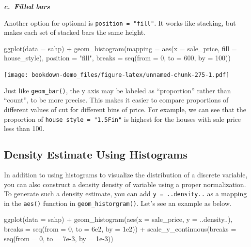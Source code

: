 \documentclass[
]{book}
\newenvironment{Shaded}{\begin{snugshade}}{\end{snugshade}}
\newcommand{\AttributeTok}[1]{\textcolor[rgb]{0.77,0.63,0.00}{#1}}
\newcommand{\DecValTok}[1]{\textcolor[rgb]{0.00,0.00,0.81}{#1}}
\newcommand{\FloatTok}[1]{\textcolor[rgb]{0.00,0.00,0.81}{#1}}
\newcommand{\FunctionTok}[1]{\textcolor[rgb]{0.00,0.00,0.00}{#1}}
\newcommand{\NormalTok}[1]{#1}
\newcommand{\SpecialCharTok}[1]{\textcolor[rgb]{0.00,0.00,0.00}{#1}}
\newcommand{\StringTok}[1]{\textcolor[rgb]{0.31,0.60,0.02}{#1}}
\begin{document}
\textbf{\emph{c.~Filled bars}}

Another option for optional is \texttt{position\ =\ "fill"}. It works like stacking, but makes each set of stacked bars the same height.

\begin{Shaded}
\begin{Highlighting}[]
\FunctionTok{ggplot}\NormalTok{(}\AttributeTok{data =}\NormalTok{ sahp) }\SpecialCharTok{+} \FunctionTok{geom\_histogram}\NormalTok{(}\AttributeTok{mapping =} \FunctionTok{aes}\NormalTok{(}\AttributeTok{x =}\NormalTok{ sale\_price, }\AttributeTok{fill =}\NormalTok{ house\_style), }\AttributeTok{position =} \StringTok{"fill"}\NormalTok{, }\AttributeTok{breaks =} \FunctionTok{seq}\NormalTok{(}\AttributeTok{from =} \DecValTok{0}\NormalTok{, }\AttributeTok{to =} \DecValTok{600}\NormalTok{, }\AttributeTok{by =} \DecValTok{100}\NormalTok{))}
\end{Highlighting}
\end{Shaded}

\texttt{[image: bookdown-demo\_files/figure-latex/unnamed-chunk-275-1.pdf]}

Just like \texttt{geom\_bar()}, the y axis may be labeled as ``proportion'' rather than ``count'', to be more precise. This makes it easier to compare proportions of different values of cut for different bins of price. For example, we can see that the proportion of \texttt{house\_style\ =\ "1.5Fin"} is highest for the houses with sale price less than 100.

\hypertarget{density-estimate-using-histograms}{%
\subsection{Density Estimate Using Histograms}\label{density-estimate-using-histograms}}

In addition to using histograms to visualize the distribution of a discrete variable, you can also construct a density density of variable using a proper normalization. To generate such a density estimate, you can add \texttt{y\ =\ ..density..} as a mapping in the \texttt{aes()} function in \texttt{geom\_historgram()}. Let's see an example as below.

\begin{Shaded}
\begin{Highlighting}[]
\FunctionTok{ggplot}\NormalTok{(}\AttributeTok{data =}\NormalTok{ sahp) }\SpecialCharTok{+}  \FunctionTok{geom\_histogram}\NormalTok{(}\FunctionTok{aes}\NormalTok{(}\AttributeTok{x =}\NormalTok{ sale\_price, }\AttributeTok{y =}\NormalTok{ ..density..), }\AttributeTok{breaks =} \FunctionTok{seq}\NormalTok{(}\AttributeTok{from =} \DecValTok{0}\NormalTok{, }\AttributeTok{to =} \FloatTok{6e2}\NormalTok{, }\AttributeTok{by =} \FloatTok{1e2}\NormalTok{)) }\SpecialCharTok{+} \FunctionTok{scale\_y\_continuous}\NormalTok{(}\AttributeTok{breaks =} \FunctionTok{seq}\NormalTok{(}\AttributeTok{from =} \DecValTok{0}\NormalTok{, }\AttributeTok{to =} \FloatTok{7e{-}3}\NormalTok{, }\AttributeTok{by =} \FloatTok{1e{-}3}\NormalTok{))}
\end{Highlighting}
\end{Shaded}
\end{document}
